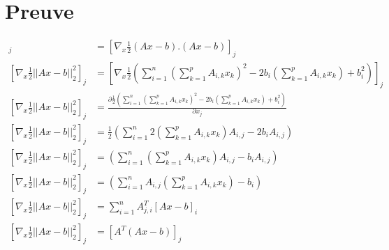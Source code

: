 \documentclass[a4paper,10pt]{article}
\begin{document}
\section{Preuve}
\begin{align*}
[\nabla_{x} \frac{1}{2}||Ax - b||^{2}_{2}]_{j} &= [\nabla_{x} \frac{1}{2}(Ax - b).(Ax - b)]_{j}\\
[\nabla_{x} \frac{1}{2}||Ax - b||^{2}_{2}]_{j} &= [\nabla_{x} \frac{1}{2}(\sum^{n}_{i = 1} (\sum^{p}_{k = 1} A_{i, k}x_{k})^{2} - 2b_{i}(\sum^{p}_{k = 1} A_{i, k}x_{k}) + b_{i}^{2})]_{j}\\
[\nabla_{x} \frac{1}{2}||Ax - b||^{2}_{2}]_{j} &= \frac{\partial\frac{1}{2}(\sum^{n}_{i = 1} (\sum^{p}_{k = 1} A_{i, k}x_{k})^{2} - 2b_{i}(\sum^{p}_{k = 1} A_{i, k}x_{k}) + b_{i}^{2})}{\partial x_{j}}\\
[\nabla_{x} \frac{1}{2}||Ax - b||^{2}_{2}]_{j} &= \frac{1}{2}(\sum^{n}_{i = 1} 2(\sum^{p}_{k = 1} A_{i, k}x_{k})A_{i, j} - 2b_{i} A_{i, j})\\
[\nabla_{x} \frac{1}{2}||Ax - b||^{2}_{2}]_{j} &= (\sum^{n}_{i = 1} (\sum^{p}_{k = 1} A_{i, k}x_{k})A_{i, j} - b_{i} A_{i, j})\\
[\nabla_{x} \frac{1}{2}||Ax - b||^{2}_{2}]_{j} &= (\sum^{n}_{i = 1} A_{i, j}(\sum^{p}_{k = 1} A_{i, k}x_{k}) - b_{i} )\\
[\nabla_{x} \frac{1}{2}||Ax - b||^{2}_{2}]_{j} &= \sum^{n}_{i = 1} A^{T}_{j, i}[Ax - b]_{i}\\
[\nabla_{x} \frac{1}{2}||Ax - b||^{2}_{2}]_{j} &= [A^{T}(Ax - b)]_{j}
\end{align*}
\end{document}
